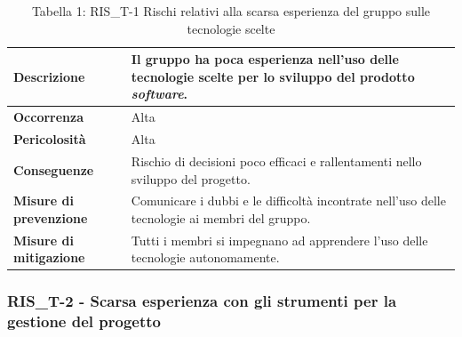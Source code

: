 \documentclass[a4paper,10pt]{article}
\begin{document}
\begin{table}[H]
\centering
\renewcommand{\arraystretch}{1.3}

\begin{tabularx}{\textwidth}{|p{4cm}|X|}
\hline
\textbf{Descrizione} & 
Il gruppo ha poca esperienza nell’uso delle tecnologie scelte per lo sviluppo del prodotto \textit{software}. \\ \hline

\textbf{Occorrenza} & Alta \\ \hline

\textbf{Pericolosità} & Alta \\ \hline

\textbf{Conseguenze} & 
Rischio di decisioni poco efficaci e rallentamenti nello sviluppo del progetto. \\ \hline

\textbf{Misure di prevenzione} & Comunicare i dubbi e le difficoltà incontrate nell’uso delle tecnologie ai membri del gruppo. \\ \hline

\textbf{Misure di mitigazione} &
Tutti i membri si impegnano ad apprendere l’uso delle tecnologie autonomamente. \\ \hline

\end{tabularx}

\caption{Tabella 1: RIS\_T-1 Rischi relativi alla scarsa esperienza del gruppo sulle tecnologie scelte}
\end{table}

\subsubsection{RIS\_T-2 - Scarsa esperienza con gli strumenti per la gestione del progetto}
\end{document}
